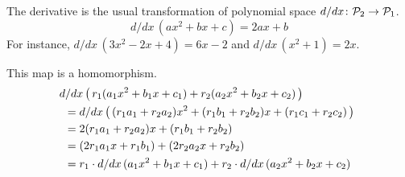 \documentclass[10pt,t]{beamer}
\begin{document}
\begin{frame}
\ex
The derivative
is the usual transformation of polynomial space
$\mbox{$d/dx\colon \mathcal{P}_2\to \mathcal{P}_1$}$.
\begin{equation*}
  d/dx\,(ax^2+bx+c)=2ax+b
\end{equation*}
For instance, $d/dx\,(3x^2-2x+4)=6x-2$
and $d/dx\,(x^2+1)=2x$.

\pause
This map is a homomorphism.
\begin{multline*}
  d/dx\,\big(\,r_1(a_1x^2+b_1x+c_1)+r_2(a_2x^2+b_2x+c_2)\,\big)  \hspace*{5em}  \\
  \begin{aligned} 
    &=d/dx\,\big(\,(r_1a_1+r_2a_2)x^2+(r_1b_1+r_2b_2)x+(r_1c_1+r_2c_2)\,\big)   \\
    &=2(r_1a_1+r_2a_2)x+(r_1b_1+r_2b_2)   \\
    &=(2r_1a_1x+r_1b_1)+(2r_2a_2x+r_2b_2)   \\
    &=r_1\cdot d/dx\,(a_1x^2+b_1x+c_1)
      +r_2\cdot d/dx\,(a_2x^2+b_2x+c_2)
  \end{aligned}
\end{multline*}
\end{frame}
\end{document}
